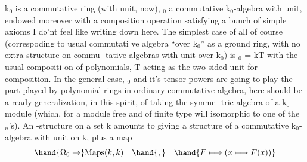  k$_0$ is a commutative ring (with unit, now), \hand{$\Omega$}$_0$ a commutative k$_0$-algebra
 with unit, endowed moreover with a composition operation 
satisfying a bunch of simple axioms I do'nt feel like writing down here.
The simplest case of all of course (correspoding to  usual commutati%
ve algebra ``over k$_0$'' as a ground ring, with no extra structure on commu-%
tative algebras with unit over k$_0$) is \hand{$\Omega$}$_0$ = k\hand{[}T\hand{]}\hand{,} with the usual compositi%
on of polynomials, T acting as the two-sided unit for composition. In
the general case, \hand{$\Omega$}$_0$ and it's tensor powers  are going to play the part
played by polynomial rings in ordinary commutative algebra,  here
should be a ready generalization, in this spirit, of taking the symme-%
tric algebra of a k$_0$-module (which, for a module free and of finite type\hand{,}
will  isomorphic to one of the \hand{$\Omega$}$_n$'s). An \hand{$\Omega$}-structure on a set  k
amounts to giving a structure of a commutative k$_0$-algebra with unit on k,
plus a map
\[ \hand{\Omega_0 \to} \mathrm{Maps}(k,k) \quad \hand{,} \quad \hand{F \longmapsto (x \longmapsto F(x))} \]


